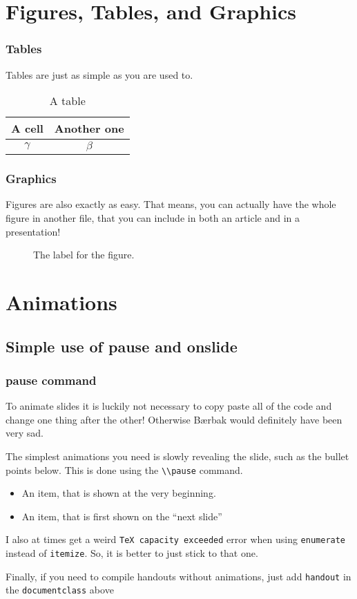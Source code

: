 \documentclass[english, aspectratio=169]{beamer}
\begin{document}
\section{Figures, Tables, and Graphics}
\begin{frame}
  \frametitle{Tables}
  Tables are just as simple as you are used to.

  \begin{table}
    \centering
    \begin{tabular}{c|c}
      A cell & Another one
      \\ \hline
      $\gamma$ & $\beta$
    \end{tabular}
    
    \caption{A table}
    \label{tab:label}
  \end{table}  
\end{frame}


\begin{frame}
  \frametitle{Graphics}
  Figures are also exactly as easy. That means, you can actually have the whole
  figure in another file, that you can include in both an article and in a
  presentation!

  \begin{figure}
    \centering
    

    \caption{The label for the figure.}
    \label{fig:label}
  \end{figure}
\end{frame}


\section{Animations}
\subsection{Simple use of pause and onslide}
\begin{frame}
  \frametitle{pause command}
  To animate slides it is luckily not necessary to copy paste all of the code
  and change one thing after the other! Otherwise Bærbak would definitely have
  been very sad.
  
  The simplest animations you need is slowly revealing the slide, such as the
  bullet points below. This is done using the \lstinline{\\pause}
  command.

  \begin{itemize}
  \item An item, that is shown at the very beginning.

    \pause
    
  \item An item, that is first shown on the ``next slide''
  \end{itemize}

  \pause
  I also at times get a weird \lstinline{TeX capacity exceeded} error when using
  \lstinline{enumerate} instead of \lstinline{itemize}. So, it is better to just
  stick to that one.

  Finally, if you need to compile handouts without animations, just add
  \lstinline{handout} in the \lstinline{documentclass} above
\end{frame}
\end{document}
